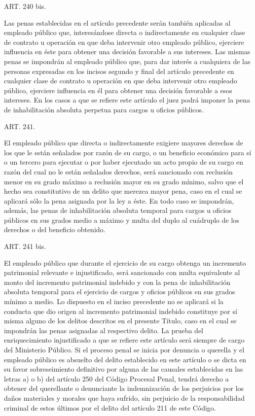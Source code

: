     ART. 240 bis.


    Las penas establecidas en el artículo precedente serán también aplicadas al empleado público que, interesándose directa o indirectamente en cualquier clase de contrato u operación en que deba intervenir otro empleado público, ejerciere influencia en éste para obtener una decisión favorable a sus intereses.
    Las mismas penas se impondrán al empleado público que, para dar interés a cualquiera de las personas expresadas en los incisos segundo y final del artículo precedente en cualquier clase de contrato u operación en que deba intervenir otro empleado público, ejerciere influencia en él para obtener una decisión favorable a esos intereses.
    En los casos a que se refiere este artículo el juez podrá imponer la pena de inhabilitación absoluta perpetua para cargos u oficios públicos.


    ART. 241.

    El empleado público que directa o indirectamente exigiere mayores derechos de los que le están señalados por razón de su cargo, o un beneficio económico para sí o un tercero para ejecutar o por haber ejecutado un acto propio de su cargo en razón del cual no le están señalados derechos, será sancionado con reclusión menor en su grado máximo a reclusión mayor en su grado mínimo, salvo que el hecho sea constitutivo de un delito que merezca mayor pena, caso en el cual se aplicará sólo la pena asignada por la ley a éste. En todo caso se impondrán, además, las penas de inhabilitación absoluta temporal para cargos u oficios públicos en sus grados medio a máximo y multa del duplo al cuádruplo de los derechos o del beneficio obtenido.


   
    ART. 241 bis.

    El empleado público que durante el ejercicio de su cargo obtenga un incremento patrimonial relevante e injustificado, será sancionado con multa equivalente al monto del incremento patrimonial indebido y con la pena de inhabilitación absoluta temporal para el ejercicio de cargos y oficios públicos en sus grados mínimo a medio.
    Lo dispuesto en el inciso precedente no se aplicará si la conducta que dio origen al incremento patrimonial indebido constituye por sí misma alguno de los delitos descritos en el presente Título, caso en el cual se impondrán las penas asignadas al respectivo delito.
    La prueba del enriquecimiento injustificado a que se refiere este artículo será siempre de cargo del Ministerio Público.
    Si el proceso penal se inicia por denuncia o querella y el empleado público es absuelto del delito establecido en este artículo o se dicta en su favor sobreseimiento definitivo por alguna de las causales establecidas en las letras a) o b) del artículo 250 del Código Procesal Penal, tendrá derecho a obtener del querellante o denunciante la indemnización de los perjuicios por los daños materiales y morales que haya sufrido, sin perjuicio de la responsabilidad criminal de estos últimos por el delito del artículo 211 de este Código.


